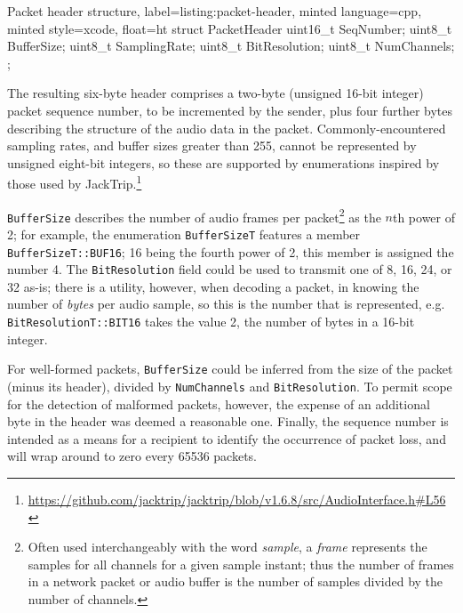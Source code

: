 \documentclass[utf8]{FrontiersinHarvard}
\begin{document}
    \begin{codelisting}{
        Packet header structure,
        label=listing:packet-header,
        minted language=cpp,
        minted style=xcode,
        float=ht
    }
        struct PacketHeader {
            uint16_t SeqNumber;
            uint8_t BufferSize;
            uint8_t SamplingRate;
            uint8_t BitResolution;
            uint8_t NumChannels;
        };
    \end{codelisting}

    The resulting six-byte header comprises a two-byte (unsigned 16-bit integer)
    packet sequence number, to be incremented by the sender, plus four further bytes
    describing the structure of the audio data in the packet.
    Commonly-encountered sampling rates, and buffer sizes greater than 255, cannot
    be represented by unsigned eight-bit integers, so these are supported by
    enumerations inspired by those used by JackTrip.\footnote{
        \url{https://github.com/jacktrip/jacktrip/blob/v1.6.8/src/AudioInterface.h\#L56}
    }

    \texttt{BufferSize} describes the number of audio frames per packet\footnote{
        Often used interchangeably with the word \textit{sample}, a \textit{frame}
        represents the samples for all channels for a given sample instant;
        thus the number of frames in a network packet or audio buffer is the number
        of samples divided by the number of channels.
    } as the $n$th power of 2; for example, the enumeration \texttt{BufferSizeT}
    features a member \texttt{BufferSizeT::BUF16}; 16 being the fourth power of 2,
    this member is assigned the number 4.
    The \texttt{BitResolution} field could be used to transmit one of 8, 16, 24, or
    32 as-is; there is a utility, however, when decoding a packet, in knowing the
    number of \textit{bytes} per audio sample, so this is the number that is
    represented, e.g. \texttt{BitResolutionT::BIT16} takes the value 2, the number
    of bytes in a 16-bit integer.

    For well-formed packets, \texttt{BufferSize} could be inferred from the size of
    the packet (minus its header), divided by \texttt{NumChannels} and
    \texttt{BitResolution}.
    To permit scope for the detection of malformed packets, however, the expense
    of an additional byte in the header was deemed a reasonable one.
    Finally, the sequence number is intended as a means for a recipient to identify
    the occurrence of packet loss, and will wrap around to zero every \num{65536}
    packets.
\end{document}

